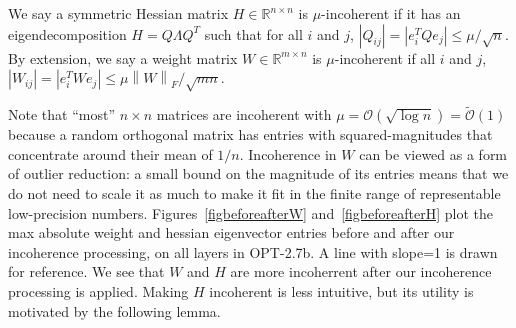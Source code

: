\begin{definitionrep}
We say a symmetric Hessian matrix $H \in \mathbb{R}^{n \times n}$ is $\mu$-incoherent if it has an eigendecomposition $H = Q \Lambda Q^T$ such that for all $i$ and $j$,
$\left| Q_{ij} \right| = \left| e_i^T Q e_j \right| \le \mu / \sqrt{n}$. By extension, we say a weight matrix $W \in \mathbb{R}^{m \times n}$ is $\mu$-incoherent if all $i$ and $j$,
$\left| W_{ij} \right| = \left| e_i^T W e_j \right| \le \mu \left\|W\right\|_F / \sqrt{mn}$.
\end{definitionrep}

Note that ``most'' $n \times n$ matrices are incoherent with $\mu = \mathcal{O}(\sqrt{\log n}) = \tilde{\mathcal{O}}(1)$ because a random orthogonal matrix has entries with squared-magnitudes that concentrate around their mean of $1/n$. Incoherence in $W$ can be viewed as a form of outlier reduction: a small bound on the magnitude of its entries means that we do not need to scale it as much to make it fit in the finite range of representable low-precision numbers.
Figures~\ref{figbeforeafterW} and~\ref{figbeforeafterH} plot the max absolute weight and hessian eigenvector entries before and after our incoherence processing, on all layers in OPT-2.7b. A line with slope=1 is drawn for reference. We see that $W$ and $H$ are more incoherrent after our incoherence processing is applied. Making $H$ incoherent is less intuitive, but its utility is motivated by the following lemma.

